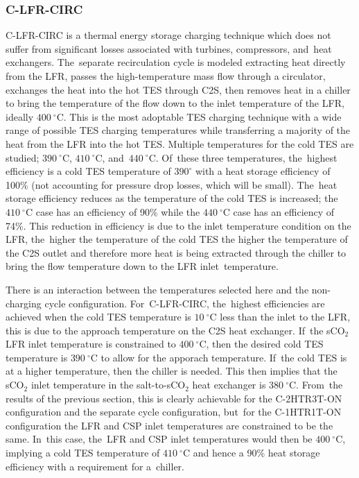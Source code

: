 \documentclass[sustainability,article,accept,moreauthors,pdftex]{Definitions/mdpi}
\begin{document}
\begin{paracol}{2}
\subsubsection{C-LFR-CIRC}

C-LFR-CIRC is a thermal energy storage charging technique which does not suffer from significant losses associated with turbines, compressors, and~heat exchangers. The~separate recirculation cycle is modeled extracting heat directly from the LFR, passes the high-temperature mass flow through a circulator, exchanges the heat into the hot TES through C2S, then removes heat in a chiller to bring the temperature of the flow down to the inlet temperature of the LFR, ideally $400~^{\circ}$C. This is the most adoptable TES charging technique with a wide range of possible TES charging temperatures while transferring a majority of the heat from the LFR into the hot TES. Multiple temperatures for the cold TES are studied; $390~^{\circ}$C, $410~^{\circ}$C, and~$440~^{\circ}$C. Of~these three temperatures, the~highest efficiency is a cold TES temperature of $390^{\circ}$ with a heat storage efficiency of 100\% (not accounting for pressure drop losses, which will be small). The~heat storage efficiency reduces as the temperature of the cold TES is increased; the $410~^{\circ}$C case has an efficiency of 90\% while the $440~^{\circ}$C case has an efficiency of 74\%. This reduction in efficiency is due to the inlet temperature condition on the LFR, the~higher the temperature of the cold TES the higher the temperature of the C2S outlet and therefore more heat is being extracted through the chiller to bring the flow temperature down to the LFR inlet~temperature. 

There is an interaction between the temperatures selected here and the non-charging cycle configuration. For~C-LFR-CIRC, the~highest efficiencies are achieved when the cold TES temperature is $10~^{\circ}$C less than the inlet to the LFR, this is due to the approach temperature on the C2S heat exchanger. If~the sCO$_2$ LFR inlet temperature is constrained to $400~^{\circ}$C, then the desired cold TES temperature is $390~^{\circ}$C to allow for the apporach temperature. If~the cold TES is at a higher temperature, then the chiller is needed. This then implies that the sCO$_2$ inlet temperature in the salt-to-sCO$_2$ heat exchanger is  $380~^{\circ}$C. From~the results of the previous section, this is clearly achievable for the C-2HTR3T-ON configuration and the separate cycle configuration, but~for the C-1HTR1T-ON configuration the LFR and CSP inlet temperatures are constrained to be the same. In~this case, the~LFR and CSP inlet temperatures would then be $400~^{\circ}$C, implying a cold TES temperature of  $410~^{\circ}$C and hence a 90\% heat storage efficiency with a requirement for a~chiller.



\end{paracol}
\end{document}
